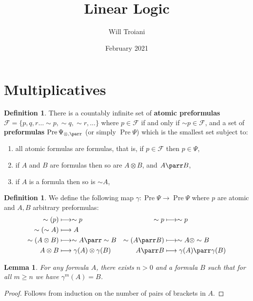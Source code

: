 \documentclass[12pt]{article}
\title{Linear Logic}
\author{Will Troiani}
\date{February 2021}
\theoremstyle{plain}
\newtheorem{lemma}[thm]{Lemma}
\theoremstyle{definition}
\newtheorem{defn}[thm]{Definition} %
\newcommand{\scr}[1]{\mathscr{#1}}
\newcommand{\lto}{\longrightarrow}
\newcommand{\negation}{\sim}
\begin{document}
\maketitle
\tableofcontents
\section{Multiplicatives}
\begin{defn}\label{def:formulas}
There is a countably infinite set of \textbf{atomic preformulas} $\scr{F} = \lbrace p,q,r\hdots \negation p, \negation q, \negation r,...\rbrace$ where $p \in \scr{F}$ if and only if $\negation p \in \scr{F}$, and a set of \textbf{preformulas} $\operatorname{Pre}\Psi_{\otimes,\parr}$ (or simply $\operatorname{Pre}\Psi$) which is the smallest set subject to:
\begin{enumerate}
    \item all atomic formulas are formulas, that is, if $p \in \scr{F}$ then $p \in \Psi$,
    \item if $A$ and $B$ are formulas then so are $A \otimes B$, and $A \parr B$,
    \item\label{def:formulas_negation} if $A$ is a formula then so is $\sim A$,
\end{enumerate}
\end{defn}
\begin{defn}\label{def:negation_normal_map}
We define the following map $\gamma: \operatorname{Pre}\Psi \lto \operatorname{Pre}\Psi$ where $p$ are atomic and $A,B$ arbitrary preformulas:
\begin{align*}
    \negation (p) &\longmapsto \negation p & \negation p &\longmapsto \negation p\\
    \negation (\negation A) &\longmapsto A \\
    \negation (A \otimes B) &\longmapsto \negation A \parr \negation B & \negation (A \parr B) &\longmapsto \negation A \otimes \negation B\\
    A \otimes B &\longmapsto \gamma(A) \otimes \gamma(B) & A \parr B &\longmapsto \gamma(A) \parr \gamma(B)
\end{align*}
\end{defn}
\begin{lemma}\label{lem:negation_normal_form}
For any formula $A$, there exists $n > 0$ and a formula $B$ such that for all $m \ge n$ we have $\gamma^m(A) = B$.
\end{lemma}
\begin{proof}
Follows from induction on the number of pairs of brackets in $A$.
\end{proof}
\end{document}
